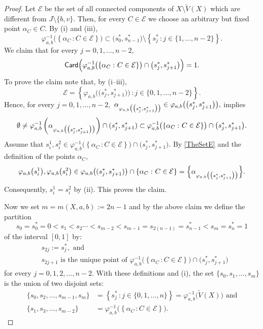 \documentclass[a4paper, 11pt]{amsart}
\numberwithin{equation}{section}
\theoremstyle{customnumberedtheorem}
\theoremstyle{definitionwithbfnote}
\DeclareMathOperator{\Card}{\textsf{\upshape Card}}
\newcommand{\set}[2]{\ensuremath{\left\{#1 \,\colon #2\right\}}}
\begin{document}
\begin{proof}
Let $\mathcal{E}$ be the set of all connected components
of $X \setminus \widetilde{V}(X)$ which are different from
$J\setminus \{b,v\}.$
Then, for every $C \in \mathcal{E}$ we choose an arbitrary but fixed point
$\alpha_C \in C.$
By (i) and (iii),
\[
 \varphi_{a, b}^{-1}\bigl(\set{\alpha_C}{C \in \mathcal{E}}\bigr) \subset
  \bigl(s^*_0, s^*_{n-1}\bigr) \setminus \set{s^*_j}{j\in\{1,\dots,n-2\}}.
\]
We claim that for every $j=0,1,\dots, n-2,$
\[ \Card\Bigl(\varphi_{a, b}^{-1}\bigl(\set{\alpha_C}{C \in \mathcal{E}}\bigr) \cap \bigl(s^*_j, s^*_{j+1}\bigr) \Bigr) = 1. \]
To prove the claim note that, by (i--iii),
\begin{equation}\label{TheSetE}
 \mathcal{E} = \set{\varphi_{a, b}\bigl(\bigl(s^*_j,s^*_{j+1}\bigr)\bigr)}{j\in\{0,1,\dots, n-2\}}.
\end{equation}
Hence, for every $j=0,1,\dots, n-2,$
$
\alpha\sb{\varphi_{a, b}\bigl(\bigl(s^*_j,s^*_{j+1}\bigr)\bigr)} \in \varphi_{a, b}\bigl(\bigl(s^*_j,s^*_{j+1}\bigr)\bigr),
$
implies
\[
\emptyset \ne \varphi_{a, b}^{-1}\left(\alpha\sb{\varphi_{a, b}\bigl(\bigl(s^*_j,s^*_{j+1}\bigr)\bigr)}\right)
   \cap (s^*_j,s^*_{j+1}) \subset \varphi_{a, b}^{-1}\bigl(\set{\alpha_C}{C \in \mathcal{E}}\bigr) \cap \bigl(s^*_j, s^*_{j+1}\bigr) .
\]
Assume that
$
 s_i^1, s_i^2 \in \varphi_{a, b}^{-1}\bigl(\set{\alpha_C}{C \in \mathcal{E}}\bigr) \cap \bigl(s^*_j, s^*_{j+1}\bigr).
$
By \eqref{TheSetE} and the definition of the points $\alpha_C,$
\[
\varphi_{a, b}\bigl(s_i^1\bigr), \varphi_{a, b}\bigl(s_i^2\bigr) \in
 \varphi_{a, b}\bigl((s^*_j,s^*_{j+1})\bigr) \cap \set{\alpha_C}{C \in \mathcal{E}} =
 \Bigl\{\alpha\sb{\varphi_{a, b}\bigl(\bigl(s^*_j,s^*_{j+1}\bigr)\bigr)}\Bigr\}.
\]
Consequently, $s_i^1 = s_i^2$ by (ii). This proves the claim.

Now we set $m = m(X, a, b) := 2n-1$ and by the above claim we define the partition
\[
  s_0 = s^*_0 = 0 < s_1 < s_ 2 \cdots < s_{m-2} < s_{m-1} = s_ {2(n-1)} = s^*_{n-1} < s_m = s^*_n = 1
\]
of the interval $[0,1]$ by:
\[\begin{split}
& s_{2j} := s^*_j,\text{ and} \\
& s_{2j+1} \text{ is the unique point of } \varphi_{a, b}^{-1}\bigl(\set{\alpha_C}{C \in \mathcal{E}}\bigr) \cap \bigl(s^*_j, s^*_{j+1}\bigr)
\end{split}\]
for every $j=0,1,2,\dots, n-2.$
With these definitions and (i), the set
$\{s_0,s_1,\dots,s_m\}$ is the union of two disjoint sets:
\begin{equation}\label{construction-partition-setversion}
\begin{split}
\{s_0,s_2,\dots,s_{m-1},s_m\} &= \set{s^*_j}{j\in\{0,1,\dots,n\}} = \varphi_{a, b}^{-1}\bigl(\widetilde{V}(X)\bigr)\text{ and} \\
\{s_1,s_3,\dots,s_{m-2}\}     &= \varphi_{a, b}^{-1}\bigl(\set{\alpha_C}{C \in \mathcal{E}}\bigr).
\end{split}
\end{equation}


\end{proof}
\end{document}
